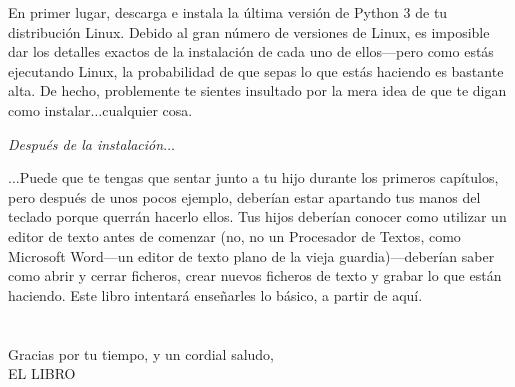 \begin{LINUX}

\noindent
En primer lugar, descarga e instala la última versión de Python 3 de tu distribución Linux. Debido al gran número de versiones de Linux, es imposible dar los detalles exactos de la instalación de cada uno de ellos---pero como estás ejecutando Linux, la probabilidad de que sepas lo que estás haciendo es bastante alta. De hecho, problemente te sientes insultado por la mera idea de que te digan como instalar$\ldots$cualquier cosa.

\end{LINUX}

\noindent
\emph{\color{BrickRed}Después de la instalación$\ldots$}

\noindent
$\ldots$Puede que te tengas que sentar junto a tu hijo durante los primeros capítulos, pero después de unos pocos ejemplo, deberían estar apartando tus manos del teclado porque querrán hacerlo ellos. Tus hijos deberían conocer como utilizar un editor de texto antes de comenzar (no, no un Procesador de Textos, como Microsoft Word---un editor de texto plano de la vieja guardia)---deberían saber como abrir y cerrar ficheros, crear nuevos ficheros de texto y grabar lo que están haciendo. Este libro intentará enseñarles lo básico, a partir de aquí.
\\
\\
\noindent\\
Gracias por tu tiempo, y un cordial saludo,
\noindent\\
EL LIBRO
